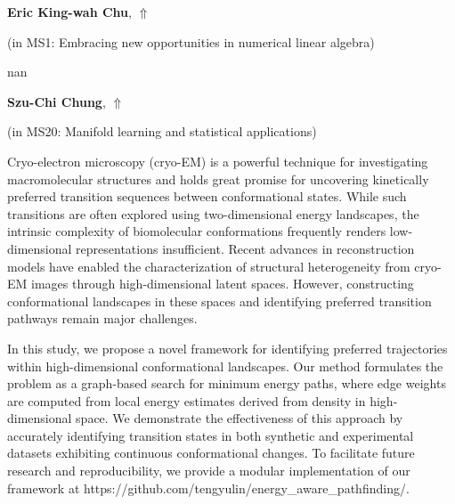 \documentclass[ILAS2025-program.tex]{subfiles}
\begin{document}
     \hypertarget{down0304}{}\begin{ilasabstract}
    
    \textbf{Eric King-wah Chu},  \hfill \hyperlink{up0304}{$\Uparrow$}
    
    (in {\color{mstitle}MS1: Embracing new opportunities in numerical linear algebra})
        
        \mtskip
    nan\end{ilasabstract}
     \hypertarget{down0042}{}\begin{ilasabstract}
    
    \textbf{Szu-Chi Chung},  \hfill \hyperlink{up0042}{$\Uparrow$}
    
    (in {\color{mstitle}MS20: Manifold learning and statistical applications})
        
        \mtskip
    Cryo-electron microscopy (cryo-EM) is a powerful technique for investigating macromolecular structures and holds great promise for uncovering kinetically preferred transition sequences between conformational states. While such transitions are often explored using two-dimensional energy landscapes, the intrinsic complexity of biomolecular conformations frequently renders low-dimensional representations insufficient. Recent advances in reconstruction models have enabled the characterization of structural heterogeneity from cryo-EM images through high-dimensional latent spaces. However, constructing conformational landscapes in these spaces and identifying preferred transition pathways remain major challenges. 

In this study, we propose a novel framework for identifying preferred trajectories within high-dimensional conformational landscapes. Our method formulates the problem as a graph-based search for minimum energy paths, where edge weights are computed from local energy estimates derived from density in high-dimensional space. We demonstrate the effectiveness of this approach by accurately identifying transition states in both synthetic and experimental datasets exhibiting continuous conformational changes. To facilitate future research and reproducibility, we provide a modular implementation of our framework at https://github.com/tengyulin/energy\_aware\_pathfinding/.
\end{ilasabstract}
\end{document}
